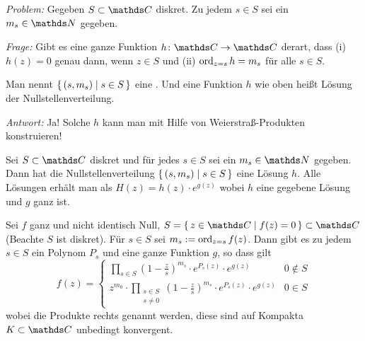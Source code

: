\emph{Problem:} Gegeben $S\subset \CC$ diskret. Zu jedem $s\in S$ sei ein $m_s \in \NN$ gegeben.

\emph{Frage:} Gibt es eine ganze Funktion $h\colon \CC \ra \CC$ derart, dass (i) $h(z) = 0$ genau dann, wenn $z\in S$ und (ii) $\operatorname*{ord}_{z=s} h = m_s$ für alle $s \in S$.

Man nennt $\left\{\,(s, m_s) \mid s\in S\,\right\}$ eine .
Und eine Funktion $h$ wie oben heißt Lösung der Nullstellenverteilung.

\emph{Antwort:} Ja! Solche $h$ kann man mit Hilfe von Weierstraß-Produkten konstruieren!

\begin{satz-list}\label{satz:weierstrasprodukt}
\item Sei $S\subset \CC$ diskret und für jedes $s\in S$ sei ein $m_s \in \NN$ gegeben. Dann hat die Nullstellenverteilung $\left\{\,(s, m_s) \mid s\in S\,\right\}$ eine Lösung $h$.
Alle Lösungen erhält man als $H(z) = h(z)\cdot e^{g(z)}$ wobei $h$ eine gegebene Lösung und $g$ ganz ist.

\item Sei $f$ ganz und nicht identisch Null, $S=\Set{z\in\CC \mid f(z) = 0}\subset\CC$ (Beachte $S$ ist diskret).
Für $s\in S$ sei $m_s := \operatorname*{ord}_{z=s} f(z)$.
Dann gibt es zu jedem $s\in S$ ein Polynom $P_s$ und eine ganze Funktion $g$, so dass gilt
\[
	f(z) =
	\begin{cases}
		\displaystyle \prod_{s\in S} \left(1-\frac{z}{s}\right)^{m_s}\cdot e^{P_s(z)}\cdot e^{g(z)} & 0 \not\in S \\
		\displaystyle z^{m_0} \cdot \prod_{\substack{s\in S\\ \scriptscriptstyle s\not=0}} \left(1-\frac{z}{s}\right)^{m_s}\cdot e^{P_s(z)}\cdot e^{g(z)} & 0 \in S
	\end{cases}
\]
wobei die Produkte rechts  genannt werden, diese sind auf Kompakta $K\subset \CC$ unbedingt konvergent.
\end{satz-list}

